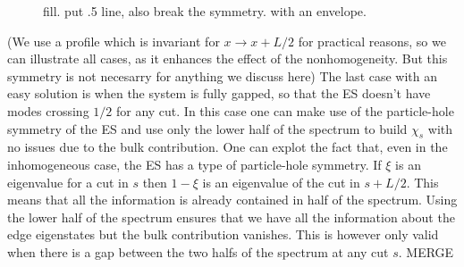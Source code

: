 \documentclass[twocolumn,amsmath,longbibliography,amssymb,superscriptaddress]{revtex4-1}
\begin{document}
\begin{figure}[h!]
\centering
{}\hspace{0mm}



\caption{ fill. put .5 line, also break the symmetry. with an envelope.}
\label{4}
\end{figure}
(We use a profile which is invariant for $x\rightarrow x+L/2$ for practical reasons, so we can illustrate all cases, as it enhances the effect of the nonhomogeneity. But this symmetry is not necesarry for anything we discuss here)
The last case with an easy solution is when the system is fully gapped, so that the ES doesn't have modes crossing $1/2$ for any cut. In this case one can make use of the particle-hole symmetry of the ES and use only the lower half of the spectrum to build $\chi_s$ with no issues due to the bulk contribution. 
One can explot the fact that, even in the inhomogeneous case, the ES has a type of particle-hole symmetry. If $\xi$ is an eigenvalue for a cut in $s$ then $1-\xi$ is an eigenvalue of the cut in $s+L/2$. This means that all the information is already contained in half of the spectrum. Using the lower half of the spectrum ensures that we have all the information about the edge eigenstates but the bulk contribution vanishes. This is however only valid when there is a gap between the two halfs of the spectrum at any cut $s$. MERGE
\end{document}
